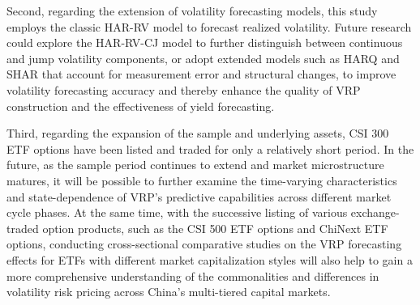 \documentclass[a4paper, 12pt]{article}    %
\begin{document}
Second, regarding the extension of volatility forecasting models, this study employs the classic HAR-RV model to forecast realized volatility. Future research could explore the HAR-RV-CJ model to further distinguish between continuous and jump volatility components, or adopt extended models such as HARQ and SHAR that account for measurement error and structural changes, to improve volatility forecasting accuracy and thereby enhance the quality of VRP construction and the effectiveness of yield forecasting.

Third, regarding the expansion of the sample and underlying assets, CSI 300 ETF options have been listed and traded for only a relatively short period. In the future, as the sample period continues to extend and market microstructure matures, it will be possible to further examine the time-varying characteristics and state-dependence of VRP’s predictive capabilities across different market cycle phases. At the same time, with the successive listing of various exchange-traded option products, such as the CSI 500 ETF options and ChiNext ETF options, conducting cross-sectional comparative studies on the VRP forecasting effects for ETFs with different market capitalization styles will also help to gain a more comprehensive understanding of the commonalities and differences in volatility risk pricing across China’s multi-tiered capital markets.

	\newpage
	\renewcommand\refname{References} %
	
\end{document}
